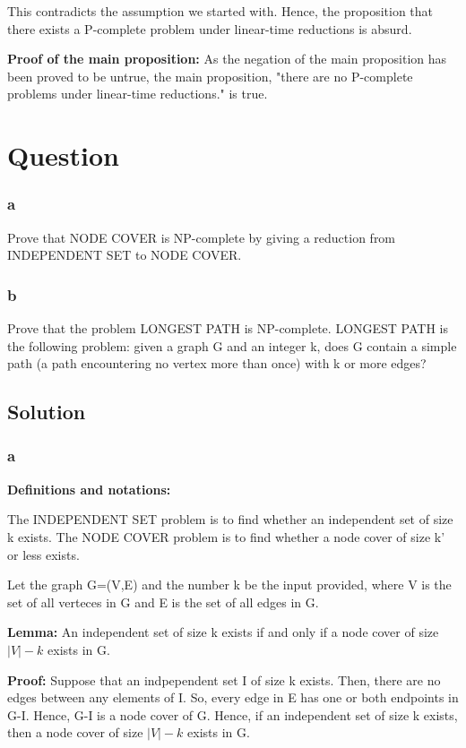 \documentclass[10pt]{article}
\begin{document}
This contradicts the assumption we started with. Hence, the proposition that there exists a P-complete problem under linear-time reductions is absurd.

\textbf{Proof of the main proposition:} As the negation of the main proposition has been proved to be untrue, the main proposition, "there are no P-complete problems under linear-time reductions." is true.

\section{Question}
\subsubsection*{a}
Prove that NODE COVER is NP-complete by giving a reduction from INDEPENDENT SET to NODE COVER.
\subsubsection*{b}
Prove that the problem LONGEST PATH is NP-complete. LONGEST PATH is the following problem: given a graph G and an integer k, does G contain a simple path (a path encountering no vertex more than once) with k or more edges?

\subsection{Solution}
\subsubsection*{a}

\textbf{Definitions and notations:}

The INDEPENDENT SET problem is to find whether an independent set of size k exists. The NODE COVER problem is to find whether a node cover of size k' or less exists.

Let the graph G=(V,E) and the number k be the input provided, where V is the set of all verteces in G and E is the set of all edges in G.

\textbf{Lemma:} An independent set of size k exists if and only if a node cover of size $|V|-k$ exists in G.

\textbf{Proof:} Suppose that an indpependent set I of size k exists. Then, there are no edges between any elements of I. So, every edge in E has one or both endpoints in G-I. Hence, G-I is a node cover of G. Hence, if an independent set of size k exists, then a node cover of size $|V|-k$ exists in G.
\end{document}
